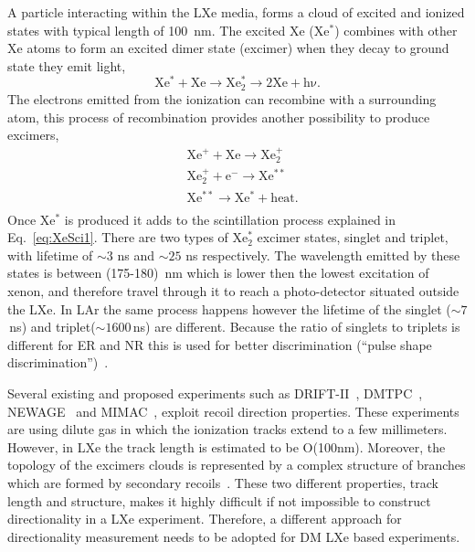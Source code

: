A particle interacting within the LXe media, forms a cloud of excited and ionized states with typical length of 100~nm. 
The excited Xe (Xe$^*$) combines with other Xe atoms to form an excited dimer state (excimer) when they decay to ground state they emit light, 
\begin{equation} \label{eq:XeSci1}
 \mathrm{Xe^*+Xe \rightarrow Xe^*_2 \rightarrow 2Xe + h \nu}. 
\end{equation}
The electrons emitted from the ionization can recombine with a surrounding atom, this process of recombination provides another possibility to produce excimers,
\begin{equation} \label{eq:XeSci2}
\begin{split}
  &\mathrm{Xe^{+} + Xe \rightarrow Xe^{+}_2} \\
  &\mathrm{Xe^{+}_2 + e^{-}  \rightarrow Xe^{**}} \\
  &\mathrm{Xe^{**}   \rightarrow Xe^* + heat}.\\
  \end{split}
\end{equation}  
Once Xe$^*$ is produced it adds to the scintillation process explained in Eq.~\ref{eq:XeSci1}. There are two types of Xe$^*_2$ excimer states, 
singlet and triplet, with lifetime of $\sim3$ ns and $\sim25$ ns respectively. The wavelength emitted by these states is between (175-180)~nm 
which is lower then the lowest excitation of xenon, and therefore travel through it to reach a photo-detector situated outside the LXe. In LAr the same process happens however the lifetime of the singlet ($\sim7$\,ns) and triplet($\sim1600$\,ns) are different. Because the ratio of singlets to triplets is different for ER and NR this is used for better discrimination (``pulse shape discrimination'')~\cite{Lippincott:2008ad}.

Several existing and proposed experiments such as DRIFT-II~\cite{Muna:2007zz}, DMTPC~\cite{Deaconu:2017vam}, NEWAGE~\cite{Yakabe:2016pjh} and MIMAC~\cite{Riffard:2016mgw}, exploit recoil direction properties. These experiments are using dilute gas in which the ionization tracks extend to a few millimeters. However, in LXe the track length is estimated to be O(100nm). Moreover, the topology of the excimers clouds is represented by a complex structure of branches which are formed by secondary recoils~\cite{Chepel:2012sj}. These two different properties, track length and structure, makes it highly difficult if not impossible to construct directionality in a LXe experiment. Therefore, a different approach for directionality measurement needs to be adopted for DM LXe based experiments.

